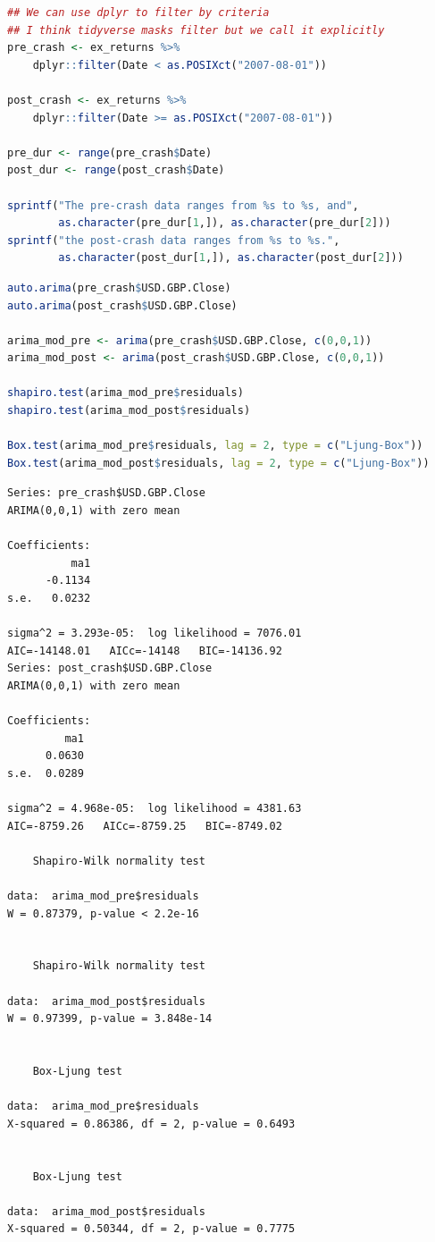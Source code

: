 \documentclass[a4paper]{article}
\begin{document}
\begin{lstlisting}[language=r,label=lst:org63f9454,caption={Pre-Post Crisis split},captionpos=b,numbers=none]
## We can use dplyr to filter by criteria
## I think tidyverse masks filter but we call it explicitly
pre_crash <- ex_returns %>%
    dplyr::filter(Date < as.POSIXct("2007-08-01"))

post_crash <- ex_returns %>%
    dplyr::filter(Date >= as.POSIXct("2007-08-01"))

pre_dur <- range(pre_crash$Date)
post_dur <- range(post_crash$Date)

sprintf("The pre-crash data ranges from %s to %s, and",
        as.character(pre_dur[1,]), as.character(pre_dur[2]))          
sprintf("the post-crash data ranges from %s to %s.",
        as.character(post_dur[1,]), as.character(post_dur[2]))
\end{lstlisting}

\begin{lstlisting}[language=r,label=lst:orgf80e3cd,caption={Question 4: ARIMA mean model fitting},captionpos=b,numbers=none]
auto.arima(pre_crash$USD.GBP.Close)
auto.arima(post_crash$USD.GBP.Close)

arima_mod_pre <- arima(pre_crash$USD.GBP.Close, c(0,0,1))
arima_mod_post <- arima(post_crash$USD.GBP.Close, c(0,0,1)) 

shapiro.test(arima_mod_pre$residuals)
shapiro.test(arima_mod_post$residuals)

Box.test(arima_mod_pre$residuals, lag = 2, type = c("Ljung-Box"))
Box.test(arima_mod_post$residuals, lag = 2, type = c("Ljung-Box"))
\end{lstlisting}

\label{org775da50}
\begin{verbatim}
Series: pre_crash$USD.GBP.Close 
ARIMA(0,0,1) with zero mean 

Coefficients:
          ma1
      -0.1134
s.e.   0.0232

sigma^2 = 3.293e-05:  log likelihood = 7076.01
AIC=-14148.01   AICc=-14148   BIC=-14136.92
Series: post_crash$USD.GBP.Close 
ARIMA(0,0,1) with zero mean 

Coefficients:
         ma1
      0.0630
s.e.  0.0289

sigma^2 = 4.968e-05:  log likelihood = 4381.63
AIC=-8759.26   AICc=-8759.25   BIC=-8749.02

	Shapiro-Wilk normality test

data:  arima_mod_pre$residuals
W = 0.87379, p-value < 2.2e-16


	Shapiro-Wilk normality test

data:  arima_mod_post$residuals
W = 0.97399, p-value = 3.848e-14


	Box-Ljung test

data:  arima_mod_pre$residuals
X-squared = 0.86386, df = 2, p-value = 0.6493


	Box-Ljung test

data:  arima_mod_post$residuals
X-squared = 0.50344, df = 2, p-value = 0.7775
\end{verbatim}
\end{document}
